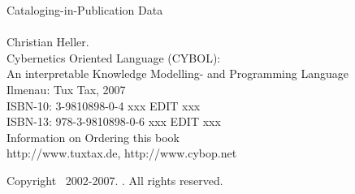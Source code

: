 %
%
%
%
%
%

\small{Cataloging-in-Publication Data\\\\
    Christian Heller.\\
    Cybernetics Oriented Language (CYBOL):\\
    An interpretable Knowledge Modelling- and Programming Language\\
    Ilmenau: Tux Tax, 2007\\
    ISBN-10: 3-9810898-0-4 xxx EDIT xxx\\
    ISBN-13: 978-3-9810898-0-6 xxx EDIT xxx}\\

\small{Information on Ordering this book\\
    http://www.tuxtax.de, http://www.cybop.net}

\small{Copyright \textcopyright\ 2002-2007. \authormacro. All rights reserved.}



